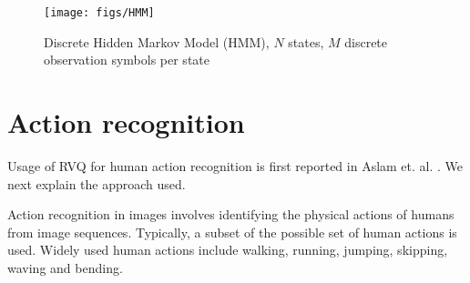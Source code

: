 \begin{Body}
%
%
%
%
%



								\begin{figure}[t]		
								\texttt{[image: figs/HMM]}
								\caption{Discrete Hidden Markov Model (HMM), $N$ states, $M$ discrete observation symbols per state}
								\label{fig:HMM}
								\end{figure}


\section{Action recognition}
Usage of RVQ for human action recognition is first reported in Aslam et. al. \cite{2010_CNF_HMMRVQ_Aslam}.  We next explain the approach used.

Action recognition in images involves identifying the physical actions of humans from image sequences.  Typically, a subset of the possible set of human actions is used.  Widely used human actions include walking, running, jumping, skipping, waving and bending. 


\end{Body}
